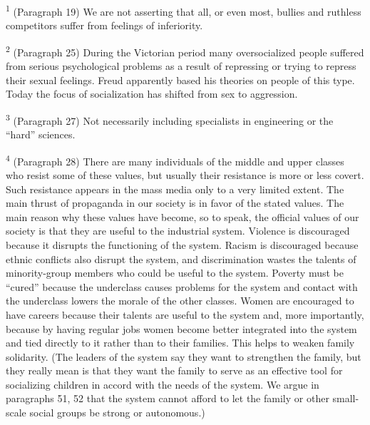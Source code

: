 \documentclass{article}
\begin{document}
\hspace{0.5cm} \textsuperscript{1} (Paragraph 19) We are not asserting that all, or even most, bullies and ruthless competitors 
suffer from feelings of inferiority.  \vspace{\baselineskip} 

\textsuperscript{2} (Paragraph 25) During the Victorian period many oversocialized people suffered from serious 
psychological problems as a result of repressing or trying to repress their sexual feelings.  Freud 
apparently based his theories on people of this type.  Today the focus of socialization has shifted 
from sex to aggression.  \vspace{\baselineskip}

\textsuperscript{3} (Paragraph 27) Not necessarily including specialists in engineering or the “hard” sciences.  \vspace{\baselineskip}

\textsuperscript{4} (Paragraph 28) There are many individuals of the middle and upper classes who resist some of 
these values, but usually their resistance is more or less covert.  Such resistance appears in the 
mass media only to a very limited extent.  The main thrust of propaganda in our society is in 
favor of the stated values.  The main reason why these values have become, so to speak, the 
official values of our society is that they are useful to the industrial system.  Violence is 
discouraged because it disrupts the functioning of the system.  Racism is discouraged because 
ethnic conflicts also disrupt the system, and discrimination wastes the talents of minority-group 
members who could be useful to the system.  Poverty must be “cured” because the underclass 
causes problems for the system and contact with the underclass lowers the morale of the other 
classes.  Women are encouraged to have careers because their talents are useful to the system 
and, more importantly, because by having regular jobs women become better integrated into the 
system and tied directly to it rather than to their families.  This helps to weaken family 
solidarity.  (The leaders of the system say they want to strengthen the family, but they really 
mean is that they want the family to serve as an effective tool for socializing children in accord 
with the needs of the system.  We argue in paragraphs 51, 52 that the system cannot afford to let 
the family or other small-scale social groups be strong or autonomous.) \vspace{\baselineskip}
\end{document}
